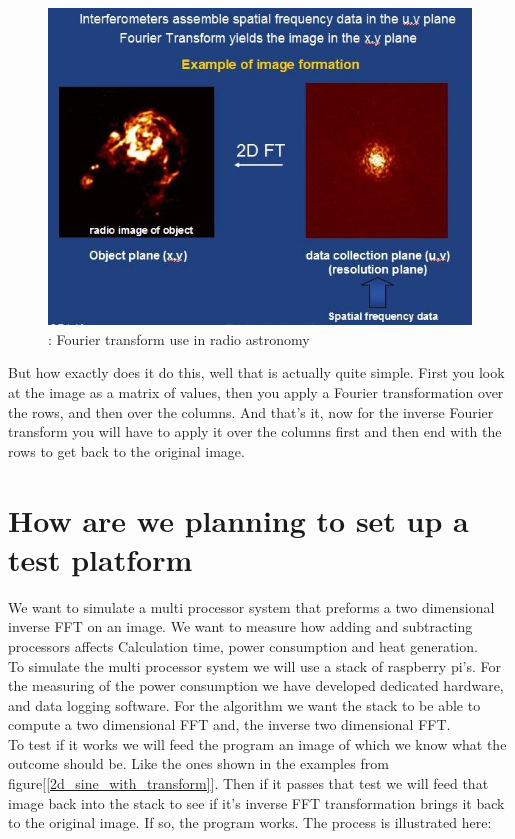 \documentclass[11pt, A4, oneside]{article}
\begin{document}
\begin{figure}[!ht]
	\centering
	\includegraphics[width=\linewidth]{example_fft}
	\caption{: Fourier transform use in radio astronomy}
	\label{FFT use in radio astronomy}
\end{figure} 

But how exactly does it do this, well that is actually quite simple. First you look at the image as a matrix of values, then you apply a Fourier transformation over the rows, and then over the columns. And that's it, now for the inverse Fourier transform you will have to apply it over the columns first and then end with the rows to get back to the original image.     

\section{How are we planning to set up a test platform}

We want to simulate a multi processor system that preforms a two dimensional inverse FFT on an image. We want to measure how adding and subtracting processors affects Calculation time, power consumption and heat generation.\\To simulate the multi processor system we will use a stack of raspberry pi's. For the measuring of the power consumption we have developed dedicated hardware, and data logging software.
For the algorithm we want the stack to be able to compute a two dimensional FFT and, the inverse two dimensional FFT.\\ To test if it works we will feed the program an image of which we know what the outcome should be. Like the ones shown in the examples from figure[\ref{2d_sine_with_transform}]. Then if it passes that test we will feed that image back into the stack to see if it's inverse FFT transformation brings it back to the original image. If so, the program works. The process is illustrated here: 
\end{document}
